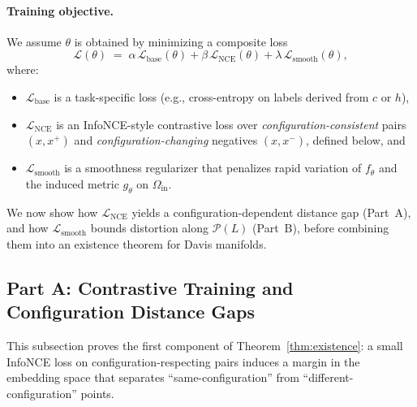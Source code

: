 \documentclass[11pt]{article}
\begin{document}
\paragraph{Training objective.}
We assume $\theta$ is obtained by minimizing a composite loss
\begin{equation}
\label{eq:existence-objective}
\mathcal{L}(\theta)
\;=\;
\alpha \,\mathcal{L}_{\mathrm{base}}(\theta)
+ \beta \,\mathcal{L}_{\mathrm{NCE}}(\theta)
+ \lambda \,\mathcal{L}_{\mathrm{smooth}}(\theta),
\end{equation}
where:
\begin{itemize}
  \item $\mathcal{L}_{\mathrm{base}}$ is a task-specific loss (e.g., cross-entropy on labels
    derived from $c$ or $h$),
  \item $\mathcal{L}_{\mathrm{NCE}}$ is an InfoNCE-style contrastive loss over
    \emph{configuration-consistent} pairs $(x,x^+)$ and \emph{configuration-changing} negatives
    $(x,x^-)$, defined below, and
  \item $\mathcal{L}_{\mathrm{smooth}}$ is a smoothness regularizer that penalizes rapid variation of
    $f_\theta$ and the induced metric $g_\theta$ on $\Omega_{\mathrm{in}}$.
\end{itemize}

We now show how $\mathcal{L}_{\mathrm{NCE}}$ yields a configuration-dependent distance gap (Part~A),
and how $\mathcal{L}_{\mathrm{smooth}}$ bounds distortion along $\mathcal{P}(L)$ (Part~B), before
combining them into an existence theorem for Davis manifolds.

\subsection{Part A: Contrastive Training and Configuration Distance Gaps}
\label{subsec:existence-contrastive}

This subsection proves the first component of Theorem~\ref{thm:existence}: a small InfoNCE loss
on configuration-respecting pairs induces a margin in the embedding space that separates
``same-configuration'' from ``different-configuration'' points.
\end{document}
